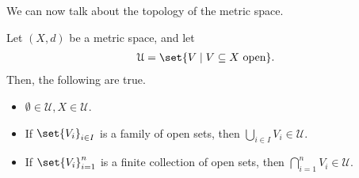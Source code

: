 We can now talk about the topology of the metric space.
\begin{fact}
  Let $\left(X,d\right)$ be a metric space, and let
  \begin{align*}
    \mathcal{U} = \set{V\mid V\subseteq X\text{ open}}.
  \end{align*}
  Then, the following are true.
  \begin{itemize}
    \item $\emptyset\in \mathcal{U},X\in \mathcal{U}$.
    \item If $\set{V_{i}}_{i\in I}$ is a family of open sets, then $\bigcup_{i\in I}V_i\in \mathcal{U}$.
    \item If $\set{V_i}_{i=1}^{n}$ is a finite collection of open sets, then $\bigcap_{i=1}^{n}V_i \in \mathcal{U}$.
  \end{itemize}
\end{fact}

